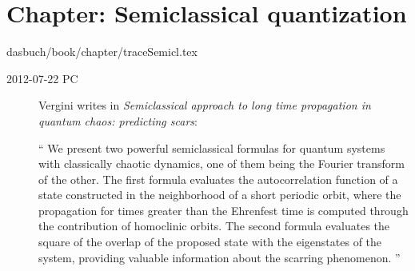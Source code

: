 \section{Chapter: Semiclassical quantization}
\label{c-traceSemicl}\noindent dasbuch/book/chapter/traceSemicl.tex

\begin{description}
\item[2012-07-22 PC]
Vergini writes in {\em Semiclassical approach to long time
propagation in quantum chaos: predicting scars}:

``
We present two powerful semiclassical formulas for quantum systems with
classically chaotic dynamics, one of them being the Fourier transform of
the other. The first formula evaluates the autocorrelation function of a
state constructed in the neighborhood of a short periodic orbit, where
the propagation for times greater than the Ehrenfest time is computed
through the contribution of homoclinic orbits. The second formula
evaluates the square of the overlap of the proposed state with the
eigenstates of the system, providing valuable information about the
scarring phenomenon.
''
\end{description}

%
%
%
%
%
%
%
%
%
%
%
%
%

